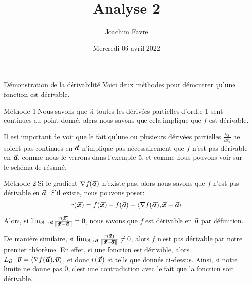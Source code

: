 \documentclass[a4paper]{article}
\title{Analyse 2}
\author{Joachim Favre}
\date{Mercredi 06 avril 2022}
\begin{document}
\maketitle


\begin{parag}{Démonstration de la dérivabilité}
    Voici deux méthodes pour démontrer qu'une fonction est dérivable.

    \begin{subparag}{Méthode 1}
        Nous savons que si toutes les dérivées partielles d'ordre 1 sont continues au point donné, alors nous savons que cela implique que $f$ est dérivable.

        Il est important de voir que le fait qu'une ou plusieurs dérivées partielles $\frac{\partial f}{\partial x_i}$ ne soient pas continues en $\bm{\protect\vec{a}}$ n'implique pas nécessairement que $f$ n'est pas dérivable en $\bm{\protect\vec{a}}$, comme nous le verrons dans l'exemple 5, et comme nous pouvons voir sur le schéma de résumé.
    \end{subparag}

    \begin{subparag}{Méthode 2}
        Si le gradient $\nabla f\left(\bvec{a}\right)$ n'existe pas, alors nous savons que $f$ n'est pas dérivable en $\bm{\protect\vec{a}}$. S'il existe, nous pouvons poser:
        \[r\left(\bvec{x}\right) = f\left(\bvec{x}\right) - f\left(\bvec{a}\right) - \left<\nabla f\left(\bvec{a}\right), \bvec{x} - \bvec{a}\right>\]

        Alors, si $\lim_{\bvec{x} \to \bvec{a}} \frac{r\left(\bvec{x}\right)}{\left\|\bvec{x} - \bvec{a}\right\|} = 0$, nous savons que $f$ est dérivable en $\bm{\protect\vec{a}}$ par définition.

        De manière similaire, si $\lim_{\bvec{x} \to \bvec{a}} \frac{r\left(\bvec{x}\right)}{\left\|\bvec{x} - \bvec{a}\right\|} \neq 0$, alors $f$ n'est pas dérivable par notre premier théorème. En effet, si une fonction est dérivable, alors $L_{\bvec{a}}\cdot \bvec{v} = \left<\nabla f\left(\bvec{a}\right), \bvec{v}\right>$, et donc $r\left(\bvec{x}\right)$ et telle que donnée ci-dessus. Ainsi, si notre limite ne donne pas 0, c'est une contradiction avec le fait que la fonction soit dérivable.
    \end{subparag}
\end{parag}
\end{document}
